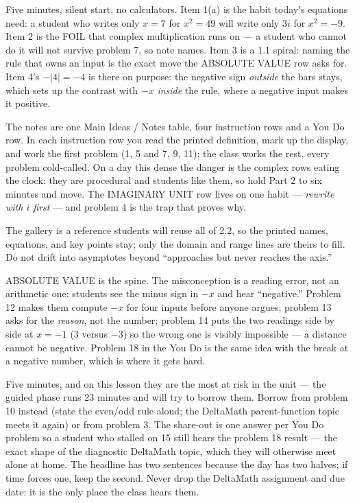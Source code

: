 \documentclass[10pt]{article}
\begin{document}
\begin{teachernote}[Warm-Up]
Five minutes, silent start, no calculators. Item 1(a) is the habit today's equations need: a
student who writes only $x = 7$ for $x^2 = 49$ will write only $3i$ for $x^2 = -9$. Item 2 is
the FOIL that complex multiplication runs on --- a student who cannot do it will not survive
problem 7, so note names. Item 3 is a 1.1 spiral: naming the rule that owns an input is the
exact move the ABSOLUTE VALUE row asks for. Item 4's $-|4| = -4$ is there on purpose: the
negative sign \textit{outside} the bars stays, which sets up the contrast with $-x$
\textit{inside} the rule, where a negative input makes it positive.
\end{teachernote}

\begin{teachernote}
The notes are one Main Ideas / Notes table, four instruction rows and a You Do row. In each
instruction row you read the printed definition, mark up the display, and work the first
problem (1, 5 and 7, 9, 11); the class works the rest, every problem cold-called. On a day
this dense the danger is the complex rows eating the clock: they are procedural and students
like them, so hold Part 2 to six minutes and move. The IMAGINARY UNIT row lives on one habit
--- \textit{rewrite with $i$ first} --- and problem 4 is the trap that proves why.

The gallery is a reference students will reuse all of 2.2, so the printed names, equations,
and key points stay; only the domain and range lines are theirs to fill. Do not drift into
asymptotes beyond ``approaches but never reaches the axis.''

ABSOLUTE VALUE is the spine. The misconception is a reading error, not an arithmetic one:
students see the minus sign in $-x$ and hear ``negative.'' Problem 12 makes them compute $-x$
for four inputs before anyone argues; problem 13 asks for the \emph{reason}, not the number;
problem 14 puts the two readings side by side at $x = -1$ (3 versus $-3$) so the wrong one is
visibly impossible --- a distance cannot be negative. Problem 18 in the You Do is the same
idea with the break at a negative number, which is where it gets hard.
\end{teachernote}

\begin{teachernote}[Debrief]
Five minutes, and on this lesson they are the most at risk in the unit --- the guided phase
runs 23 minutes and will try to borrow them. Borrow from problem 10 instead (state the even/odd
rule aloud; the DeltaMath parent-function topic meets it again) or from problem 3. The
share-out is one answer per You Do problem so a student who stalled on 15 still hears the
problem 18 result --- the exact shape of the diagnostic DeltaMath topic, which they will
otherwise meet alone at home. The headline has two sentences because the day has two halves;
if time forces one, keep the second. Never drop the DeltaMath assignment and due date: it is
the only place the class hears them.
\end{teachernote}
\end{document}
